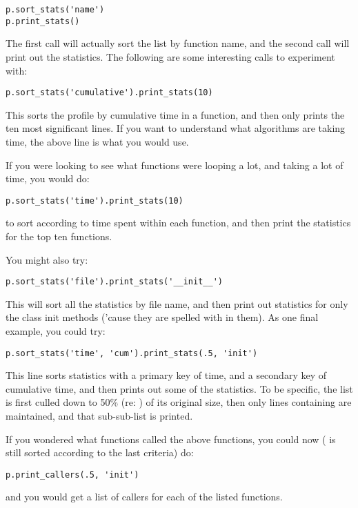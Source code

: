 \bcode\begin{verbatim}
p.sort_stats('name')
p.print_stats()
\end{verbatim}\ecode
%
The first call will actually sort the list by function name, and the
second call will print out the statistics.  The following are some
interesting calls to experiment with:

\bcode\begin{verbatim}
p.sort_stats('cumulative').print_stats(10)
\end{verbatim}\ecode
%
This sorts the profile by cumulative time in a function, and then only
prints the ten most significant lines.  If you want to understand what
algorithms are taking time, the above line is what you would use.

If you were looking to see what functions were looping a lot, and
taking a lot of time, you would do:

\bcode\begin{verbatim}
p.sort_stats('time').print_stats(10)
\end{verbatim}\ecode
%
to sort according to time spent within each function, and then print
the statistics for the top ten functions.

You might also try:

\bcode\begin{verbatim}
p.sort_stats('file').print_stats('__init__')
\end{verbatim}\ecode
%
This will sort all the statistics by file name, and then print out
statistics for only the class init methods ('cause they are spelled
with  in them).  As one final example, you could try:

\bcode\begin{verbatim}
p.sort_stats('time', 'cum').print_stats(.5, 'init')
\end{verbatim}\ecode
%
This line sorts statistics with a primary key of time, and a secondary
key of cumulative time, and then prints out some of the statistics.
To be specific, the list is first culled down to 50\% (re: )
of its original size, then only lines containing  are
maintained, and that sub-sub-list is printed.

If you wondered what functions called the above functions, you could
now ( is still sorted according to the last criteria) do:

\bcode\begin{verbatim}
p.print_callers(.5, 'init')
\end{verbatim}\ecode
%
and you would get a list of callers for each of the listed functions. 

